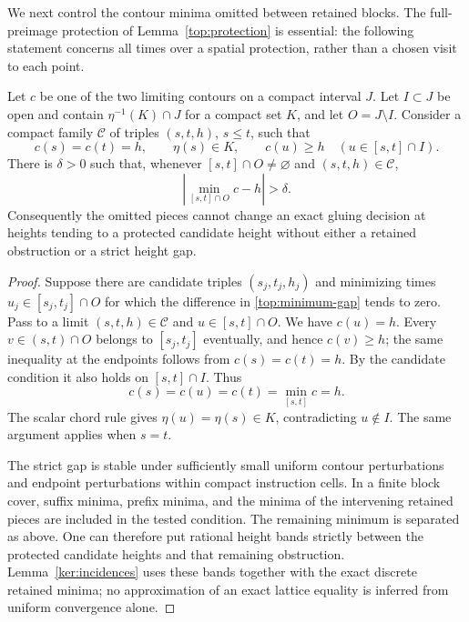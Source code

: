 We next control the contour minima omitted between retained blocks.
The full-preimage protection of Lemma~\ref{top:protection} is essential:
the following statement concerns all times over a
spatial protection, rather than a chosen visit to each point.

\begin{lemma}
\label{top:minimum-protection}
Let $c$ be one of the two limiting contours on a compact interval $J$.
Let $I\subset J$ be open and contain $\eta^{-1}(K)\cap J$ for a compact
set $K$, and let $O=J\setminus I$.  Consider a compact family
$\mathcal C$ of triples $(s,t,h)$, $s\le t$, such that
\[
 c(s)=c(t)=h,\qquad \eta(s)\in K,\qquad
 c(u)\ge h\quad (u\in[s,t]\cap I).
\]
There is $\delta>0$ such that, whenever
$[s,t]\cap O\ne\varnothing$ and $(s,t,h)\in\mathcal C$,
\begin{equation}\label{top:minimum-gap}
 \left|\min_{[s,t]\cap O}c-h\right|>\delta.
\end{equation}
Consequently the omitted pieces cannot change an exact gluing decision
at heights tending to a protected candidate height without either a
retained obstruction or a strict height gap.
\end{lemma}

\begin{proof}
Suppose there are candidate triples $(s_j,t_j,h_j)$ and minimizing
times $u_j\in[s_j,t_j]\cap O$ for which the difference in
\eqref{top:minimum-gap} tends to zero.  Pass to a limit
$(s,t,h)\in\mathcal C$ and $u\in[s,t]\cap O$.  We have $c(u)=h$.
Every $v\in(s,t)\cap O$ belongs to $[s_j,t_j]$ eventually, and hence
$c(v)\ge h$; the same inequality at the endpoints follows from
$c(s)=c(t)=h$.  By the candidate condition it also holds on
$[s,t]\cap I$.  Thus
\[
 c(s)=c(u)=c(t)=\min_{[s,t]}c=h.
\]
The scalar chord rule gives $\eta(u)=\eta(s)\in K$, contradicting
$u\notin I$.  The same argument applies when $s=t$.

The strict gap is stable under sufficiently small uniform contour
perturbations and endpoint perturbations within compact instruction
cells.  In a finite block cover, suffix minima, prefix minima, and the
minima of the intervening retained pieces are included in the tested
condition.  The remaining minimum is separated as above.  One can
therefore put rational height bands strictly between the protected
candidate heights and that remaining obstruction.  Lemma~\ref{ker:incidences}
uses these bands together with the exact discrete retained minima; no
approximation of an exact lattice equality is inferred from uniform
convergence alone.
\end{proof}


